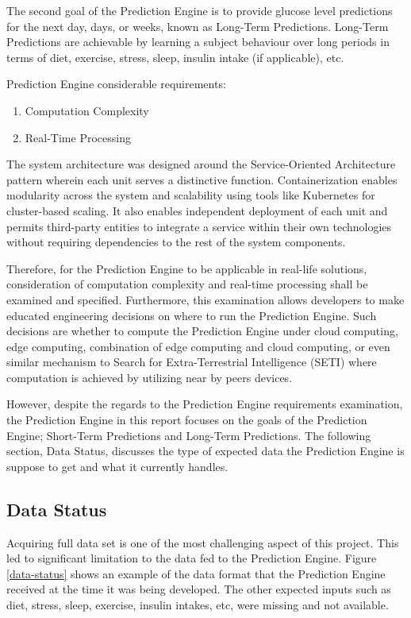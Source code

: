 The second goal of the Prediction Engine is to provide glucose level predictions for the next day, days, or weeks, known as Long-Term Predictions. Long-Term Predictions are achievable by learning a subject behaviour over long periods in terms of diet, exercise, stress, sleep, insulin intake (if applicable), etc.  

\bigbreak

Prediction Engine considerable requirements:
\begin{enumerate}
\item Computation Complexity
\item Real-Time Processing
\end{enumerate}
	
The system architecture was designed around the Service-Oriented Architecture pattern wherein each unit serves a distinctive function. Containerization enables modularity across the system and scalability using tools like Kubernetes for cluster-based scaling. It also enables independent deployment of each unit and permits third-party entities to integrate a service within their own technologies without requiring dependencies to the rest of the system components.

Therefore, for the Prediction Engine to be applicable in real-life solutions, consideration of computation complexity and real-time processing shall be examined and specified. Furthermore, this examination allows developers to make educated engineering decisions on where to run the Prediction Engine. Such decisions are whether to compute the Prediction Engine under cloud computing, edge computing, combination of edge computing and cloud computing, or even similar mechanism to Search for Extra-Terrestrial Intelligence (SETI) where computation is achieved by utilizing near by peers devices. 

\bigbreak

However, despite the regards to the Prediction Engine requirements examination, the Prediction Engine in this report focuses on the goals of the Prediction Engine; Short-Term Predictions and Long-Term Predictions. The following section, Data Status, discusses the type of expected data the Prediction Engine is suppose to get and what it currently handles.  

\subsection{Data Status}
Acquiring full data set is one of the most challenging aspect of this project. This led to significant limitation to the data fed to the Prediction Engine. Figure \ref{data-status} shows an example of the data format that the Prediction Engine received at the time it was being developed. The other expected inputs such as diet, stress, sleep, exercise, insulin intakes, etc, were missing and not available. 


